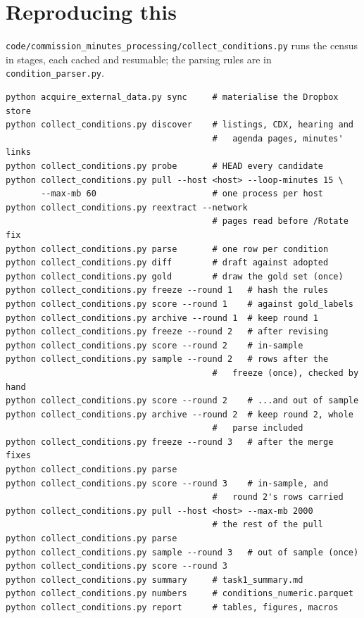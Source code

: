 \documentclass[11pt]{article}
\begin{document}
\section{Reproducing this}

\texttt{code/commission\_minutes\_processing/collect\_conditions.py} runs the census in stages,
each cached and resumable; the parsing rules are in \texttt{condition\_parser.py}.

{\small
\begin{verbatim}
python acquire_external_data.py sync     # materialise the Dropbox store
python collect_conditions.py discover    # listings, CDX, hearing and
                                         #   agenda pages, minutes' links
python collect_conditions.py probe       # HEAD every candidate
python collect_conditions.py pull --host <host> --loop-minutes 15 \
       --max-mb 60                       # one process per host
python collect_conditions.py reextract --network
                                         # pages read before /Rotate fix
python collect_conditions.py parse       # one row per condition
python collect_conditions.py diff        # draft against adopted
python collect_conditions.py gold        # draw the gold set (once)
python collect_conditions.py freeze --round 1   # hash the rules
python collect_conditions.py score --round 1    # against gold_labels
python collect_conditions.py archive --round 1  # keep round 1
python collect_conditions.py freeze --round 2   # after revising
python collect_conditions.py score --round 2    # in-sample
python collect_conditions.py sample --round 2   # rows after the
                                         #   freeze (once), checked by hand
python collect_conditions.py score --round 2    # ...and out of sample
python collect_conditions.py archive --round 2  # keep round 2, whole
                                         #   parse included
python collect_conditions.py freeze --round 3   # after the merge fixes
python collect_conditions.py parse
python collect_conditions.py score --round 3    # in-sample, and
                                         #   round 2's rows carried
python collect_conditions.py pull --host <host> --max-mb 2000
                                         # the rest of the pull
python collect_conditions.py parse
python collect_conditions.py sample --round 3   # out of sample (once)
python collect_conditions.py score --round 3
python collect_conditions.py summary     # task1_summary.md
python collect_conditions.py numbers     # conditions_numeric.parquet
python collect_conditions.py report      # tables, figures, macros
\end{verbatim}}
\end{document}
